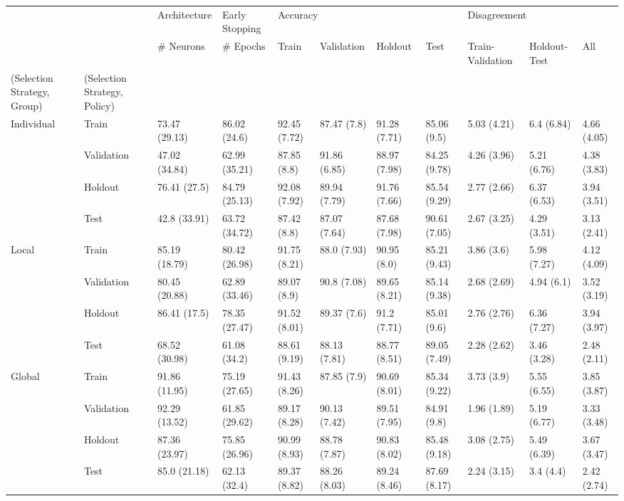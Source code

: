 \begin{table}
\centering
\label{tab:single_sets}
\begin{tabular}{lllllllllll}
\toprule
       &      &   Architecture & Early Stopping & \multicolumn{4}{l}{Accuracy} & \multicolumn{3}{l}{Disagreement} \\
       &      &      \# Neurons &       \# Epochs &         Train &    Validation &       Holdout &          Test & Train-Validation & Holdout-Test &          All \\
(Selection Strategy, Group) & (Selection Strategy, Policy) &                &                &               &               &               &               &                  &              &              \\
\midrule
Individual & Train &  73.47 (29.13) &   86.02 (24.6) &  92.45 (7.72) &   87.47 (7.8) &  91.28 (7.71) &   85.06 (9.5) &      5.03 (4.21) &   6.4 (6.84) &  4.66 (4.05) \\
       & Validation &  47.02 (34.84) &  62.99 (35.21) &   87.85 (8.8) &  91.86 (6.85) &  88.97 (7.98) &  84.25 (9.78) &      4.26 (3.96) &  5.21 (6.76) &  4.38 (3.83) \\
       & Holdout &   76.41 (27.5) &  84.79 (25.13) &  92.08 (7.92) &  89.94 (7.79) &  91.76 (7.66) &  85.54 (9.29) &      2.77 (2.66) &  6.37 (6.53) &  3.94 (3.51) \\
       & Test &   42.8 (33.91) &  63.72 (34.72) &   87.42 (8.8) &  87.07 (7.64) &  87.68 (7.98) &  90.61 (7.05) &      2.67 (3.25) &  4.29 (3.51) &  3.13 (2.41) \\
Local & Train &  85.19 (18.79) &  80.42 (26.98) &  91.75 (8.21) &   88.0 (7.93) &   90.95 (8.0) &  85.21 (9.43) &       3.86 (3.6) &  5.98 (7.27) &  4.12 (4.09) \\
       & Validation &  80.45 (20.88) &  62.89 (33.46) &   89.07 (8.9) &   90.8 (7.08) &  89.65 (8.21) &  85.14 (9.38) &      2.68 (2.69) &   4.94 (6.1) &  3.52 (3.19) \\
       & Holdout &   86.41 (17.5) &  78.35 (27.47) &  91.52 (8.01) &   89.37 (7.6) &   91.2 (7.71) &   85.01 (9.6) &      2.76 (2.76) &  6.36 (7.27) &  3.94 (3.97) \\
       & Test &  68.52 (30.98) &   61.08 (34.2) &  88.61 (9.19) &  88.13 (7.81) &  88.77 (8.51) &  89.05 (7.49) &      2.28 (2.62) &  3.46 (3.28) &  2.48 (2.11) \\
Global & Train &  91.86 (11.95) &  75.19 (27.65) &  91.43 (8.26) &   87.85 (7.9) &  90.69 (8.01) &  85.34 (9.22) &       3.73 (3.9) &  5.55 (6.55) &  3.85 (3.87) \\
       & Validation &  92.29 (13.52) &  61.85 (29.62) &  89.17 (8.28) &  90.13 (7.42) &  89.51 (7.95) &   84.91 (9.8) &      1.96 (1.89) &  5.19 (6.77) &  3.33 (3.48) \\
       & Holdout &  87.36 (23.97) &  75.85 (26.96) &  90.99 (8.93) &  88.78 (7.87) &  90.83 (8.02) &  85.48 (9.18) &      3.08 (2.75) &  5.49 (6.39) &  3.67 (3.47) \\
       & Test &   85.0 (21.18) &   62.13 (32.4) &  89.37 (8.82) &  88.26 (8.03) &  89.24 (8.46) &  87.69 (8.17) &      2.24 (3.15) &    3.4 (4.4) &  2.42 (2.74) \\
\bottomrule
\end{tabular}
\end{table}
